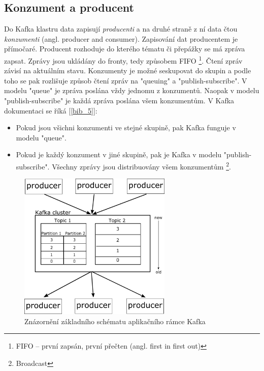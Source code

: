 \documentclass[
  digital, %
  table,   %
  nolof,     %
  nolot,     %
  oneside, %
  nocover,
  monochrome,
  12pt
]{fithesis3}
\begin{document}
\subsection*{Konzument a producent}

Do Kafka klastru data zapisují \textit{producenti} a na druhé straně z ní data čtou \textit{konzumenti} (angl. producer and consumer). Zapisování dat producentem je přímočaré. Producent rozhoduje do kterého tématu či přepážky se má zpráva zapsat. Zprávy jsou ukládány do fronty, tedy způsobem FIFO \footnote{FIFO -- první zapsán, první přečten (angl. first in first out)}. Čtení zpráv závisí na aktuálním stavu. Konzumenty je možné seskupovat do skupin a podle toho se pak rozlišuje způsob čtení zpráv na "queuing" a "publish-subscribe". V modelu "queue" je zpráva poslána vždy jednomu z konzumentů. Naopak v modelu "publish-subscribe" je každá zpráva poslána všem konzumentům. V Kafka dokumentaci se říká [\ref{bib_5}]:
\begin{itemize}
  \item Pokud jsou všichni konzumenti ve stejné skupině, pak Kafka funguje v modelu "queue".
  \item Pokud je každý konzument v jiné skupině, pak je Kafka v modelu "publish-subscribe". Všechny zprávy jsou distribuovány všem konzumentům \footnote{Broadcast}.
\end{itemize}

\begin{figure}[H]
	\centering
    \includegraphics[width=0.65\textwidth, height=0.45\textheight]{images/kafka.png}
    \caption{Znázornění základního schématu aplikačního rámce Kafka}
    \label{fig:kafka}
\end{figure}
\end{document}
